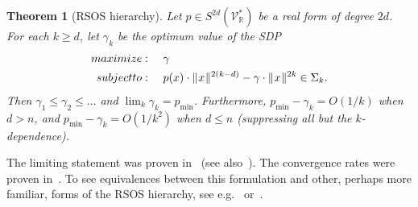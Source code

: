 \documentclass[11pt]{article}
\newtheorem{theorem}{Theorem}
\numberwithin{theorem}{section}
\theoremstyle{definition}
\newcommand{\tinyspace}{\mspace{1mu}}
\newcommand{\norm}[1]{\lVert\tinyspace #1 \tinyspace\rVert}
\newcommand{\real}{\mathbb{R}}
\newcommand\V{\mathcal{V}}
\def\ba#1\ea{\begin{align}#1\end{align}}
\newcommand{\Vr}{\V_{\real}}
\begin{document}


\begin{theorem}[RSOS hierarchy]\label{thm:intro_rsos}
Let $p \in S^{2d}(\Vr^*)$ be a real form of degree $2d$. For each $k \geq d$, let $\gamma_k$ be the optimum value of the SDP
\begin{align}\begin{split}\label{eq:SOS1}
        \textup{maximize:} \quad& \ \gamma \\
        \textup{subject to:}\quad& \ p(x) \cdot \norm{x}^{2(k-d)}-\gamma \cdot \norm{x}^{2k} \in \Sigma_{k}.
        \end{split}
        \end{align}
Then $\gamma_1 \leq \gamma_2 \leq \dots $ and $\lim_k \gamma_k = p_{\min}$. Furthermore, $p_{\min}-\gamma_k= O(1/k)$ when $d > n$, and $p_{\min}-\gamma_k= O(1/k^2)$ when $d\leq n$ (suppressing all but the $k$-dependence).
\end{theorem}

The limiting statement was proven in~\cite{reznick1995uniform} (see also~\cite{lasserre2001global}). The convergence rates were proven in~\cite{reznick1995uniform, doherty2012convergence,fang2021sum}. To see equivalences between this formulation and other, perhaps more familiar, forms of the RSOS hierarchy, see e.g.~\cite[Proposition 2]{de2005equivalence} or~\cite[Lemma 1.3]{laurent2019notes}.

\end{document}
